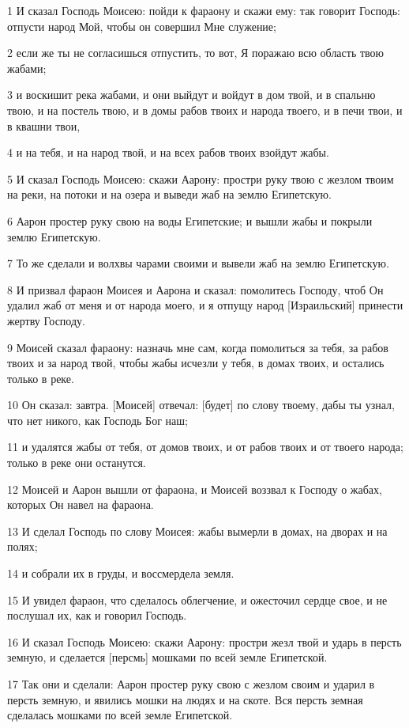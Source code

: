 \par 1 И сказал Господь Моисею: пойди к фараону и скажи ему: так говорит Господь: отпусти народ Мой, чтобы он совершил Мне служение;
\par 2 если же ты не согласишься отпустить, то вот, Я поражаю всю область твою жабами;
\par 3 и воскишит река жабами, и они выйдут и войдут в дом твой, и в спальню твою, и на постель твою, и в домы рабов твоих и народа твоего, и в печи твои, и в квашни твои,
\par 4 и на тебя, и на народ твой, и на всех рабов твоих взойдут жабы.
\par 5 И сказал Господь Моисею: скажи Аарону: простри руку твою с жезлом твоим на реки, на потоки и на озера и выведи жаб на землю Египетскую.
\par 6 Аарон простер руку свою на воды Египетские; и вышли жабы и покрыли землю Египетскую.
\par 7 То же сделали и волхвы чарами своими и вывели жаб на землю Египетскую.
\par 8 И призвал фараон Моисея и Аарона и сказал: помолитесь Господу, чтоб Он удалил жаб от меня и от народа моего, и я отпущу народ [Израильский] принести жертву Господу.
\par 9 Моисей сказал фараону: назначь мне сам, когда помолиться за тебя, за рабов твоих и за народ твой, чтобы жабы исчезли у тебя, в домах твоих, и остались только в реке.
\par 10 Он сказал: завтра. [Моисей] отвечал: [будет] по слову твоему, дабы ты узнал, что нет никого, как Господь Бог наш;
\par 11 и удалятся жабы от тебя, от домов твоих, и от рабов твоих и от твоего народа; только в реке они останутся.
\par 12 Моисей и Аарон вышли от фараона, и Моисей воззвал к Господу о жабах, которых Он навел на фараона.
\par 13 И сделал Господь по слову Моисея: жабы вымерли в домах, на дворах и на полях;
\par 14 и собрали их в груды, и воссмердела земля.
\par 15 И увидел фараон, что сделалось облегчение, и ожесточил сердце свое, и не послушал их, как и говорил Господь.
\par 16 И сказал Господь Моисею: скажи Аарону: простри жезл твой и ударь в персть земную, и сделается [персмь] мошками по всей земле Египетской.
\par 17 Так они и сделали: Аарон простер руку свою с жезлом своим и ударил в персть земную, и явились мошки на людях и на скоте. Вся персть земная сделалась мошками по всей земле Египетской.
